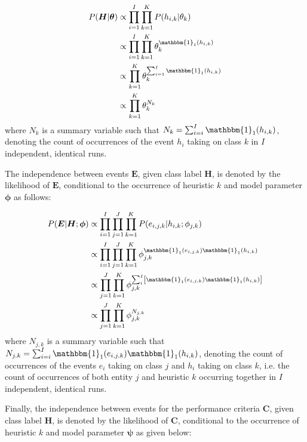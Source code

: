 \documentclass[preprint,review,12pt]{elsarticle}
\begin{document}
\begin{equation}
	\label{eq:bhh:selection_mechanism:naive_bayes:h_pmf}
	\begin{split}
		P(\boldsymbol{H} \vert \boldsymbol{\theta})
		&\propto \prod_{i=1}^{I} \prod_{k=1}^{K} P(h_{i,k} \vert \theta_{k}) \\
		&\propto \prod_{i=1}^{I} \prod_{k=1}^{K} \theta_{k}^{\mathbbm{1}_{1}(h_{i,k})} \\
		&\propto \prod_{k=1}^{K} \theta_{k}^{\sum_{i=1}^{I} \mathbbm{1}_{1}(h_{i,k})} \\
		&\propto \prod_{k=1}^{K} \theta_{k}^{N_{k}}
	\end{split}
\end{equation}
\noindent
where $N_{k}$ is a summary variable such that $N_{k} = \sum_{i=i}^{I} \mathbbm{1}_{1}(h_{i,k})$, denoting the count of occurrences of the event $h_{i}$ taking on class $k$ in $I$ independent, identical runs.

The independence between events $\boldsymbol{E}$, given class label $\boldsymbol{H}$, is denoted by the likelihood of $\boldsymbol{E}$, conditional to the occurrence of heuristic $k$ and model parameter $\boldsymbol{\phi}$ as follows:

\begin{equation}
	\label{eq:bhh:selection_mechanism:naive_bayes:EgH_pmf}
	\begin{split}
		P(\boldsymbol{E} \vert \boldsymbol{H};  \boldsymbol{\phi})
		&\propto \prod_{i=1}^{I} \prod_{j=1}^{J} \prod_{k=1}^{K} P(e_{i,j,k} \vert h_{i,k} ; \phi_{j,k})  \\
		&\propto \prod_{i=1}^{I} \prod_{j=1}^{J} \prod_{k=1}^{K} \phi_{j,k}^{\mathbbm{1}_{1}(e_{i,j,k})\mathbbm{1}_{1}(h_{i,k})} \\
		&\propto \prod_{j=1}^{J} \prod_{k=1}^{K} \phi_{j,k}^{ \sum_{i}^{I} \left[ \mathbbm{1}_{1}(e_{i,j,k}) \mathbbm{1}_{1}(h_{i,k}) \right]} \\
		&\propto \prod_{j=1}^{J} \prod_{k=1}^{K} \phi_{j,k}^{N_{j,k}}
	\end{split}
\end{equation}
\noindent
where $N_{j,k}$ is a summary variable such that $N_{j,k} = \sum_{i=i}^{I} \mathbbm{1}_{1}(e_{i,j,k})\mathbbm{1}_{1}(h_{i,k})$, denoting the count of occurrences of the events $e_{i}$ taking on class $j$ and $h_{i}$ taking on class $k$, i.e. the count of occurrences of both entity $j$ and heuristic $k$ occurring together in $I$ independent, identical runs.

Finally, the independence between events for the performance criteria $\boldsymbol{C}$, given class label $\boldsymbol{H}$, is denoted by the likelihood of $\boldsymbol{C}$, conditional to the occurrence of heuristic $k$ and model parameter $\boldsymbol{\psi}$ as given below:
\end{document}
